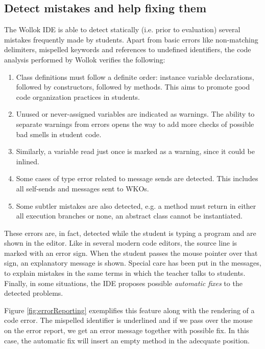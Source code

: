 \subsection{Detect mistakes and help fixing them}
\label{sec:detectMistakes}
The Wollok IDE is able to detect statically (i.e. prior to evaluation) several mistakes frequently made by students. Apart from basic errors like non-matching delimiters, mispelled keywords and references to undefined identifiers, the code analysis performed by Wollok verifies the following:
\begin{enumerate}
\item 
Class definitions must follow a definite order: instance variable declarations, followed by constructors, followed by methods. This aims to promote good code organization practices in students.
\item 
Unused or never-assigned variables are indicated as warnings. The ability to separate warnings from errors opens the way to add more checks of possible bad smells in student code.
\item 
Similarly, a variable read just once is marked as a warning, since it could be inlined.
\item 
Some cases of type error related to message sends are detected. This includes all self-sends and messages sent to WKOs.
\item 
Some subtler mistakes are also detected, e.g. a method must return in either all execution branches or none, an abstract class cannot be instantiated.
\end{enumerate}

These errors are, in fact, detected while the student is typing a program and are shown in the editor. Like in several modern code editors, the source line is marked with an error sign. When the student passes the mouse pointer over that sign, an explanatory message is shown.
Special care has been put in the messages, to explain mistakes in the same terms in which the teacher talks to students.
Finally, in some situations, the IDE proposes possible \emph{automatic fixes} to the detected problems.

Figure \ref{fig:errorReporting} exemplifies this feature along with the rendering of a code error. The mispelled identifier is underlined and if we pass over the mouse on the error report, we get an error message together with possible fix.
In this case, the automatic fix will insert an empty method in the adecquate position. 

